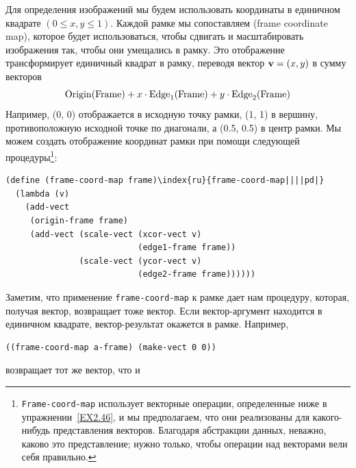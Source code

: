 Для определения изображений мы будем использовать
координаты в 
единичном квадрате $(0 \le x, y \le
1)$. Каждой рамке мы сопоставляем 
 (frame coordinate map), которое будет
использоваться, чтобы сдвигать и масштабировать изображения так, чтобы 
они умещались в рамку.  Это отображение трансформирует единичный
квадрат в рамку, переводя вектор ${\bf v} = (x, y)$ в сумму 
векторов
$$
  \mathop{\rm Origin}(\mbox{\rm Frame}) 
    + x \cdot \mbox{\rm Edge}_1 (\mbox{\rm Frame})
    + y \cdot \mbox{\rm Edge}_2 (\mbox{\rm Frame})
$$
Например, (0, 0) отображается в исходную точку рамки, (1, 1) в
вершину, противоположную исходной точке по диагонали, а (0.5, 0.5) в
центр рамки. Мы можем создать отображение координат рамки при помощи
следующей процедуры\footnote{{\tt Frame-coord-map} использует векторные
операции, определенные ниже в упражнении~\ref{EX2.46}, и мы
предполагаем, что они реализованы для какого-нибудь представления
векторов.  Благодаря абстракции данных, неважно, каково это
представление; нужно только, чтобы операции над векторами вели себя
правильно.
}:

\begin{Verbatim}[fontsize=\small]
(define (frame-coord-map frame)\index{ru}{frame-coord-map||||pd|}
  (lambda (v)
    (add-vect
     (origin-frame frame)
     (add-vect (scale-vect (xcor-vect v)
                           (edge1-frame frame))
               (scale-vect (ycor-vect v)
                           (edge2-frame frame))))))
\end{Verbatim}
Заметим, что применение {\tt frame-coord-map} к рамке дает нам
процедуру, которая, получая вектор, возвращает тоже вектор.  Если
вектор-аргумент находится в единичном квадрате, вектор-результат
окажется в рамке. Например,

\begin{Verbatim}[fontsize=\small]
((frame-coord-map a-frame) (make-vect 0 0))
\end{Verbatim}
возвращает тот же вектор, что и 

